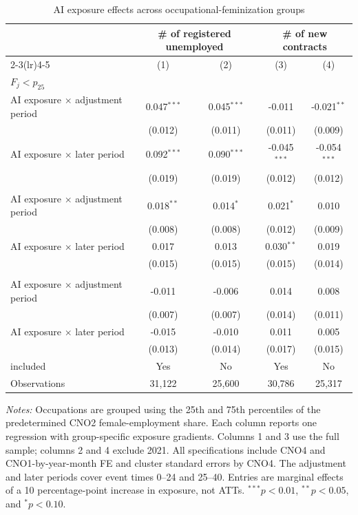 \begin{table}[H]
\centering
\caption{AI exposure effects across occupational-feminization groups}
\label{tab:v1_feminization_three_group}
\begin{threeparttable}
\small
\setlength{\tabcolsep}{5pt}
\begin{tabular}{lcccc}
\toprule
& \multicolumn{2}{c}{\# of registered unemployed} & \multicolumn{2}{c}{\# of new contracts} \\
\cmidrule(lr){2-3}\cmidrule(lr){4-5}
& (1) & (2) & (3) & (4) \\
\midrule
\multicolumn{5}{l}{\textbf{$F_j<p_{25}$}} \\
AI exposure $\times$ adjustment period & 0.047$^{***}$ & 0.045$^{***}$ & -0.011 & -0.021$^{**}$ \\
 & (0.012) & (0.011) & (0.011) & (0.009) \\
AI exposure $\times$ later period & 0.092$^{***}$ & 0.090$^{***}$ & -0.045$^{***}$ & -0.054$^{***}$ \\
 & (0.019) & (0.019) & (0.012) & (0.012) \\
\addlinespace[4pt]
\multicolumn{5}{l}{\textbf{$p_{25}\leq F_j\leq p_{75}$}} \\
AI exposure $\times$ adjustment period & 0.018$^{**}$ & 0.014$^{*}$ & 0.021$^{*}$ & 0.010 \\
 & (0.008) & (0.008) & (0.012) & (0.009) \\
AI exposure $\times$ later period & 0.017 & 0.013 & 0.030$^{**}$ & 0.019 \\
 & (0.015) & (0.015) & (0.015) & (0.014) \\
\addlinespace[4pt]
\multicolumn{5}{l}{\textbf{$F_j>p_{75}$}} \\
AI exposure $\times$ adjustment period & -0.011 & -0.006 & 0.014 & 0.008 \\
 & (0.007) & (0.007) & (0.014) & (0.011) \\
AI exposure $\times$ later period & -0.015 & -0.010 & 0.011 & 0.005 \\
 & (0.013) & (0.014) & (0.017) & (0.015) \\
\addlinespace[4pt]
\midrule
2021 included & Yes & No & Yes & No \\
Observations & 31,122 & 25,600 & 30,786 & 25,317 \\
\bottomrule
\end{tabular}
\begin{tablenotes}[flushleft]
\footnotesize
\item \emph{Notes:} Occupations are grouped using the 25th and 75th percentiles of the predetermined CNO2 female-employment share. Each column reports one regression with group-specific exposure gradients. Columns 1 and 3 use the full sample; columns 2 and 4 exclude 2021. All specifications include CNO4 and CNO1-by-year-month FE and cluster standard errors by CNO4. The adjustment and later periods cover event times 0--24 and 25--40. Entries are marginal effects of a 10 percentage-point increase in exposure, not ATTs. $^{***}p<0.01$, $^{**}p<0.05$, and $^{*}p<0.10$.
\end{tablenotes}
\end{threeparttable}
\end{table}
